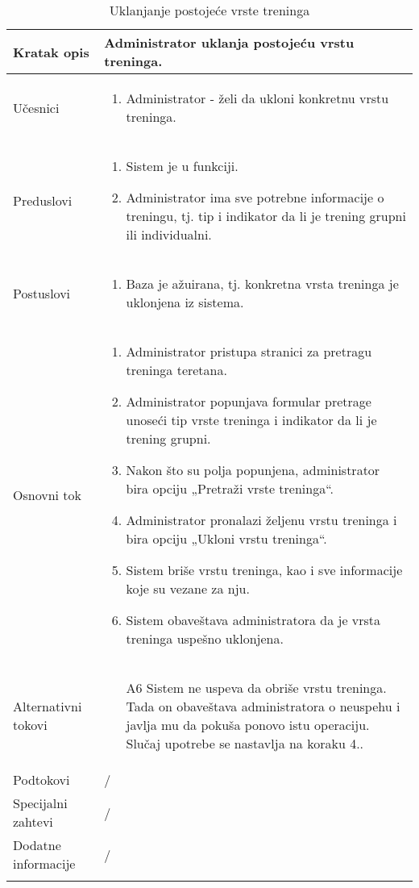 \documentclass[../main.tex]{subfiles}
\begin{document}
\begin{longtable}{| p{} | p{} |} 

\hline
    Kratak opis &  Administrator uklanja postojeću vrstu treninga.\\ 
\hline    
    Učesnici & 
    	\begin{enumerate}
        \item Administrator - želi da ukloni konkretnu vrstu treninga.
     \end{enumerate}\\
\hline
   Preduslovi & \begin{enumerate}
       \item Sistem je u funkciji.
       \item Administrator ima sve potrebne informacije o treningu, tj. tip i indikator da li je trening grupni ili individualni.
   \end{enumerate}\\
\hline  
    Postuslovi & \begin{enumerate}
        \item Baza je ažuirana, tj. konkretna vrsta treninga je uklonjena iz sistema.
    \end{enumerate}\\
\hline
    Osnovni tok & \begin{enumerate}
        \item Administrator pristupa stranici za pretragu treninga teretana.
        \item Administrator popunjava formular pretrage unoseći tip vrste treninga i indikator da li je trening grupni.
        \item Nakon što su polja popunjena, administrator bira opciju „Pretraži vrste treninga“.
        \item Administrator pronalazi željenu vrstu treninga i bira opciju „Ukloni vrstu treninga“.
        \item Sistem briše vrstu treninga, kao i sve informacije koje su vezane za nju.
        \item Sistem obaveštava administratora da je vrsta treninga uspešno uklonjena.
    \end{enumerate}\\
\hline
    Alternativni tokovi & \begin{itemize}
        \item[A6]  Sistem ne uspeva da obriše vrstu treninga. Tada on obaveštava administratora o neuspehu i javlja mu da pokuša ponovo istu operaciju. Slučaj upotrebe se nastavlja na koraku 4..

    \end{itemize}\\
\hline
    Podtokovi & /\\
\hline
    Specijalni zahtevi & /\\
\hline
    Dodatne informacije & /\\
\hline
\caption{Uklanjanje postojeće vrste treninga} %
\end{longtable}
\end{document}
